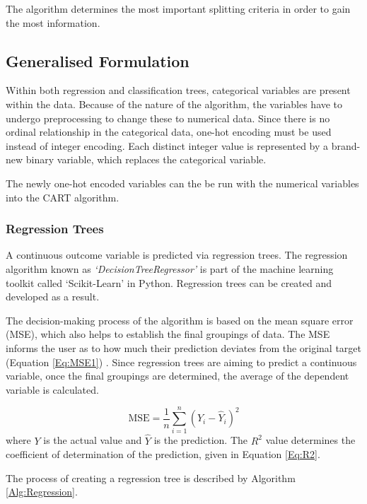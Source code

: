 \documentclass[../thesis.tex]{subfiles}
\begin{document}
The algorithm determines the most important splitting criteria in order to gain the most information.


\subsection{Generalised Formulation}
Within both regression and classification trees, categorical variables are present within the data. Because of the nature of the algorithm, the variables have to undergo preprocessing to change these to numerical data. Since there is no ordinal relationship in the categorical data, one-hot encoding must be used instead of integer encoding. Each distinct integer value is represented by a brand-new binary variable, which replaces the categorical variable.

The newly one-hot encoded variables can the be run with the numerical variables into the CART algorithm. 

\subsubsection{Regression Trees}
A continuous outcome variable is predicted via regression trees. The regression algorithm known as \textit{`DecisionTreeRegressor'} is part of the machine learning toolkit called `Scikit-Learn' \cite{Pedregosa2011} in Python. Regression trees can be created and developed as a result.

The decision-making process of the algorithm is based on the mean square error (MSE), which also helps to establish the final groupings of data. The MSE informs the user as to how much their prediction deviates from the original target (Equation \eqref{Eq:MSE1}) \cite{Karunasingha2022}. Since regression trees are aiming to predict a continuous variable, once the final groupings are determined, the average of the dependent variable is calculated.

\begin{equation}\label{Eq:MSE1}
    \text{MSE} = \frac{1}{n}\sum^{n}_{i=1}(Y_{i} - \hat{Y}_{i})^2
\end{equation}
where $Y$ is the actual value and $\hat{Y}$ is the prediction.
The $R^{2}$ value determines the coefficient of determination of the prediction, given in Equation \eqref{Eq:R2}.

The process of creating a regression tree is described by Algorithm \ref{Alg:Regression}.
\end{document}
